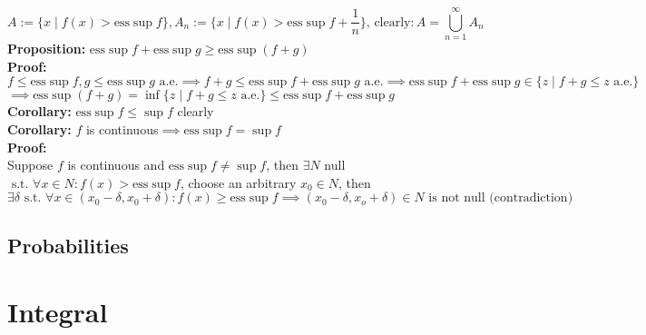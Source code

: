 \documentclass{article}
\newcommand{\cupninf}{\bigcup\limits_{n=1}^\infty}
\newcommand{\st}{\mbox{ s.t. }}
\newcommand{\clear}{\mbox{clearly}:}
\newcommand{\0}{{\bf{0}}}
\newcommand{\1}{{\bf{1}}}
\newcommand{\esssup}{\mbox{ess}\sup\limits}
\newcommand{\alev}{\mbox{ a.e.}}
\begin{document}
$$A:=\{x\mid f(x)>\esssup f\},A_n:=\{x\mid f(x)>\esssup f+\frac{1}{n}\},\,\clear A=\cupninf A_n$$
\textbf{Proposition:} $\esssup f+\esssup g\geq\esssup(f+g)$\\
\textbf{Proof:}\\
$f\le\esssup f,g\le\esssup g\alev\implies f+g\le\esssup f+\esssup g\alev\implies\esssup f+\esssup g\in\{z\mid f+g\le z\alev\}$\\
$\implies\esssup(f+g)=\inf\{z\mid f+g\le z\alev\}\le\esssup f+\esssup g$\\
\textbf{Corollary:} $\esssup f\le\sup f$ clearly\\
\textbf{Corollary:} $f$ is continuous$\implies\esssup f=\sup f$\\
\textbf{Proof:}\\
Suppose $f$ is continuous and $\esssup f\neq\sup f$, then $\exists N$ null$\st\forall x\in N: f(x)>\esssup f$, choose an arbitrary $x_0\in N$, then $\exists\delta\st\forall x\in(x_0-\delta,x_0+\delta):f(x)\geq\esssup f\implies (x_0-\delta,x_o+\delta)\in N\mbox{ is not null (contradiction)}$
\subsection{Probabilities}
\clearpage
\section{Integral}
\end{document}
